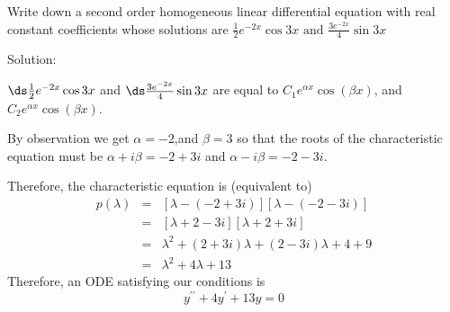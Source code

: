   
  
  
  \begin{frame}
 \begin{example}
 Write down a second order homogeneous linear differential equation with real  constant coefficients whose solutions are $ \frac{1}{2}e^{-2x}\cos 3x\text{ \ and\ \ }\frac{3e^{-2x}}{4}\sin 3x $
 \end{example}
 Solution:\\ \pause 
 

$\ds  \frac{1}{2}e^{-2x}\cos 3x$ and $ \ds \frac{3e^{-2x}}{4}\sin 3x$ are equal to $ C_1e^{\alpha x}\cos(\beta x) $, and $ C_2e^{\alpha x}\cos(\beta x) $.\\ \vsp 

By observation we get $\alpha =-2$,and $\beta =3$ so that the roots of the characteristic equation must be  $\alpha + i\beta =-2+3i$ and 
   $\alpha-i\beta =-2-3i.$ \pause 
   
 Therefore, the characteristic equation is (equivalent to) 
 \begin{eqnarray*}
 p(\lambda ) &=&[\lambda -(-2+3i)][\lambda -(-2-3i)] \\
 &=&[\lambda +2-3i][\lambda +2+3i] \\
 &=&\lambda ^{2}+(2+3i)\lambda +(2-3i)\lambda +4+9 \\
 &=&\lambda ^{2}+4\lambda +13
 \end{eqnarray*}
 \pause 
Therefore, an ODE satisfying our conditions is 
  \begin{equation*}
  y^{\prime \prime }+4y^{\prime }+13y=0
  \end{equation*}
 
  \end{frame}
  
  
  



